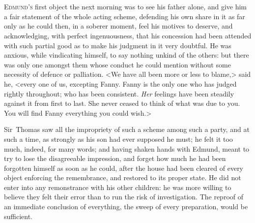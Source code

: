 \chapter[Chapter \thechapter]{} 

 \lettrine[lraise=0.3]{E}{dmund's} first object the next morning was to see his father alone, and give him a fair statement of the whole acting scheme, defending his own share in it as far only as he could then, in a soberer moment, feel his motives to deserve, and acknowledging, with perfect ingenuousness, that his concession had been attended with such partial good as to make his judgment in it very doubtful. He was anxious, while vindicating himself, to say nothing unkind of the others: but there was only one amongst them whose conduct he could mention without some necessity of defence or palliation. <We have all been more or less to blame,> said he, <every one of us, excepting Fanny. Fanny is the only one who has judged rightly throughout; who has been consistent. \textit{Her}  feelings have been steadily against it from first to last. She never ceased to think of what was due to you. You will find Fanny everything you could wish.>

Sir~Thomas saw all the impropriety of such a scheme among such a party, and at such a time, as strongly as his son had ever supposed he must; he felt it too much, indeed, for many words; and having shaken hands with Edmund, meant to try to lose the disagreeable impression, and forget how much he had been forgotten himself as soon as he could, after the house had been cleared of every object enforcing the remembrance, and restored to its proper state. He did not enter into any remonstrance with his other children: he was more willing to believe they felt their error than to run the risk of investigation. The reproof of an immediate conclusion of everything, the sweep of every preparation, would be sufficient.


